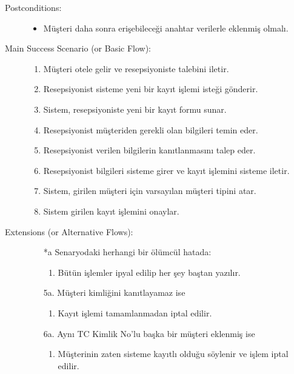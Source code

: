 \documentclass[12pt,a4paper]{report}
\begin{document}
\begin{description}
\item[Postconditions:] \hspace{10mm}
\begin{itemize}
\item Müşteri daha sonra erişebileceği anahtar verilerle eklenmiş olmalı.
\end{itemize}
\item[Main Success Scenario (or Basic Flow):] \hspace{10mm}
\begin{enumerate}
\item Müşteri otele gelir ve resepsiyoniste talebini iletir.
\item Resepsiyonist sisteme yeni bir kayıt işlemi isteği gönderir.
\item Sistem, resepsiyoniste yeni bir kayıt formu sunar.
\item Resepsiyonist müşteriden gerekli olan bilgileri temin eder.
\item Resepsiyonist verilen bilgilerin kanıtlanmasını talep eder.
\item Resepsiyonist bilgileri sisteme girer ve kayıt işlemini sisteme iletir.
\item Sistem, girilen müşteri için varsayılan müşteri tipini atar.
\item Sistem girilen kayıt işlemini onaylar.
\end{enumerate}
\item[Extensions (or Alternative Flows):] \hspace{10mm}
\begin{itemize}
\item[*a] Senaryodaki herhangi bir ölümcül hatada:
    \begin{enumerate}
    \item Bütün işlemler ipyal edilip her şey baştan yazılır.
    \end{enumerate}
\item[5a.] Müşteri kimliğini kanıtlayamaz ise
    \begin{enumerate} 
    \item Kayıt işlemi tamamlanmadan iptal edilir.
    \end{enumerate}

\item[6a.] Aynı TC Kimlik No'lu başka bir müşteri eklenmiş ise
    \begin{enumerate}
    \item Müşterinin zaten sisteme kayıtlı olduğu söylenir ve işlem iptal edilir.
    \end{enumerate}
\end{itemize}

\end{description}
\end{document}
